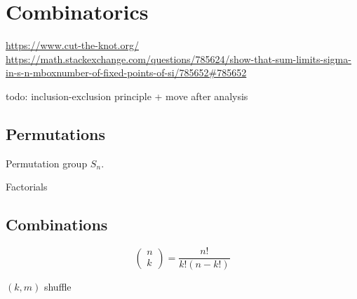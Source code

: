 \chapter{Combinatorics}

\url{https://www.cut-the-knot.org/}
\url{https://math.stackexchange.com/questions/785624/show-that-sum-limits-sigma-in-s-n-mboxnumber-of-fixed-points-of-si/785652#785652}

todo: inclusion-exclusion principle + move after analysis
\section{Permutations}
Permutation group $S_n$.

Factorials

\section{Combinations}

\[ \begin{pmatrix}
n \\ k
\end{pmatrix} = \frac{n!}{k!(n-k!)}\]


$(k,m)$ shuffle


